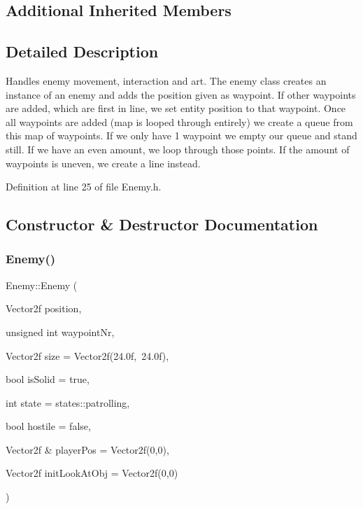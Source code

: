 \subsection*{Additional Inherited Members}


\subsection{Detailed Description}
Handles enemy movement, interaction and art. The enemy class creates an instance of an enemy and adds the position given as waypoint. If other waypoints are added, which are first in line, we set entity position to that waypoint. Once all waypoints are added (map is looped through entirely) we create a queue from this map of waypoints. If we only have 1 waypoint we empty our queue and stand still. If we have an even amount, we loop through those points. If the amount of waypoints is uneven, we create a line instead. 

Definition at line 25 of file Enemy.\+h.



\subsection{Constructor \& Destructor Documentation}
\mbox{\label{class_enemy_aa606fada257eefe1469e462768285dff}} 
\subsubsection{\texorpdfstring{Enemy()}{Enemy()}}
{\footnotesize\ttfamily Enemy\+::\+Enemy (\begin{DoxyParamCaption}\item[{Vector2f}]{position,  }\item[{unsigned int}]{waypoint\+Nr,  }\item[{Vector2f}]{size = {\ttfamily Vector2f(24.0f,~24.0f)},  }\item[{bool}]{is\+Solid = {\ttfamily true},  }\item[{int}]{state = {\ttfamily states\+:\+:patrolling},  }\item[{bool}]{hostile = {\ttfamily false},  }\item[{Vector2f \&}]{player\+Pos = {\ttfamily Vector2f(0,0)},  }\item[{Vector2f}]{init\+Look\+At\+Obj = {\ttfamily Vector2f(0,0)} }\end{DoxyParamCaption})}



